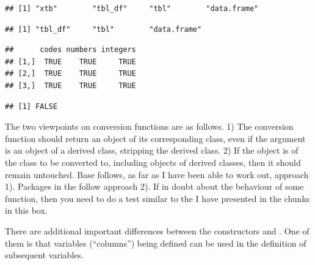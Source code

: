 \documentclass[krantz2]{krantz}\usepackage{knitr}%
\begin{document}
\begin{explainbox}
\begin{knitrout}\footnotesize
{}\color{fgcolor}\begin{kframe}
\begin{alltt}
 \hlkwb{<-} 
 \hlkwb{<-} \hlstd{(}\hlstd{,} 
\end{alltt}
\begin{verbatim}
## [1] "xtb"        "tbl_df"     "tbl"        "data.frame"
\end{verbatim}
\begin{alltt}
 \hlkwb{<-} 
\end{alltt}
\begin{verbatim}
## [1] "tbl_df"     "tbl"        "data.frame"
\end{verbatim}
\begin{alltt}
 \hlopt{==} 
\end{alltt}
\begin{verbatim}
##      codes numbers integers
## [1,]  TRUE    TRUE     TRUE
## [2,]  TRUE    TRUE     TRUE
## [3,]  TRUE    TRUE     TRUE
\end{verbatim}
\begin{alltt}
\end{alltt}
\begin{verbatim}
## [1] FALSE
\end{verbatim}
\end{kframe}
\end{knitrout}

The two viewpoints on conversion functions are as follows. 1) The conversion function should return an object of its corresponding class, even if the argument is an object of a derived class, stripping the derived class. 2) If the object is of the class to be converted to, including objects of derived classes, then it should remain untouched. Base \Rlang follows, as far as I have been able to work out, approach 1). Packages in the  follow approach 2). If in doubt about the behaviour of some function, then you need to do a test similar to the I have presented in the chunks in this box.
\end{explainbox}

There are additional important differences between the constructors  and . One of them is that variables (``columns'')  being defined can be used in the definition of subsequent variables.
\end{document}
